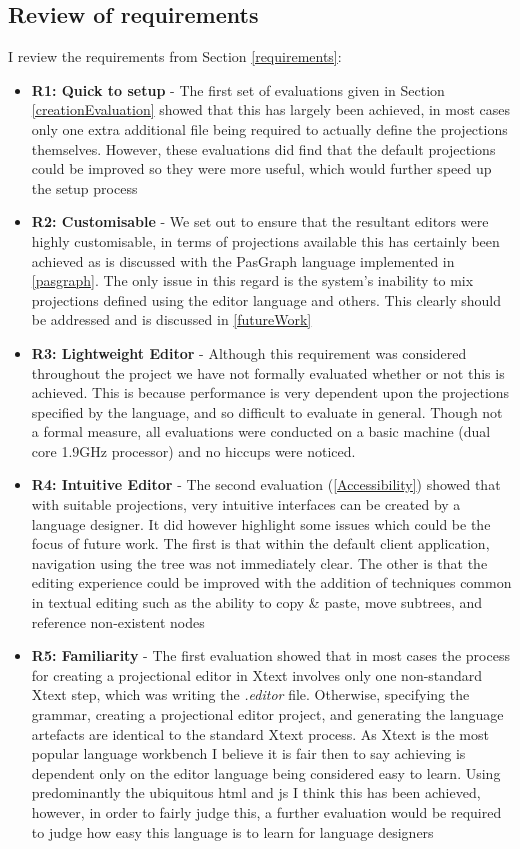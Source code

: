 \documentclass{article}
\begin{document}
\subsection{Review of requirements}
I review the requirements from Section \ref{requirements}:
\begin{itemize}
\item{\textbf{R1: Quick to setup} - The first set of evaluations given in Section \ref{creationEvaluation} showed that this has largely been achieved, in most cases only one extra additional file being required to actually define the projections themselves. However, these evaluations did find that the default projections could be improved so they were more useful, which would further speed up the setup process}
\item{\textbf{R2: Customisable} - We set out to ensure that the resultant editors were highly customisable, in terms of projections available this has certainly been achieved as is discussed with the PasGraph language implemented in \ref{pasgraph}. The only issue in this regard is the system's inability to mix projections defined using the editor language and others. This clearly should be addressed and is discussed in \ref{futureWork}  }
\item{\textbf{R3: Lightweight Editor} - Although this requirement was considered throughout the project we have not formally evaluated whether or not this is achieved. This is because performance is very dependent upon the projections specified by the language, and so difficult to evaluate in general. Though not a formal measure, all evaluations were conducted on a basic machine (dual core 1.9GHz processor) and no hiccups were noticed. }
\item{\textbf{R4: Intuitive Editor} - The second evaluation (\ref{Accessibility}) showed that with suitable projections, very intuitive interfaces can be created by a language designer. It did however highlight some issues which could be the focus of future work. The first is that within the default client application, navigation using the tree was not immediately clear. The other is that the editing experience could be improved with the addition of techniques common in textual editing such as the ability to copy \& paste, move subtrees, and reference non-existent nodes}
\item{\textbf{R5: Familiarity} - The first evaluation showed that in most cases the process for creating a projectional editor in Xtext involves only one non-standard Xtext step, which was writing the \emph{.editor} file. Otherwise, specifying the grammar, creating a projectional editor project, and generating the language artefacts are identical to the standard Xtext process. As Xtext is the most popular language workbench I believe it is fair then to say achieving \RFamiliarity is dependent only on the editor language being considered easy to learn. Using predominantly the ubiquitous html and js I think this has been achieved, however, in order to fairly judge this, a further evaluation would be required to judge how easy this language is to learn for language designers}
\end{itemize}
\end{document}
